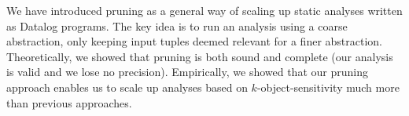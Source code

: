 
We have introduced pruning as a general way of scaling up static analyses
written as Datalog programs.  The key idea is to run an analysis using a coarse
abstraction, only keeping input tuples deemed relevant for a finer abstraction.
Theoretically, we showed that pruning is both sound and complete (our analysis
is valid and we lose no precision).  Empirically, we showed that our pruning
approach enables us to scale up analyses based on $k$-object-sensitivity much
more than previous approaches.

